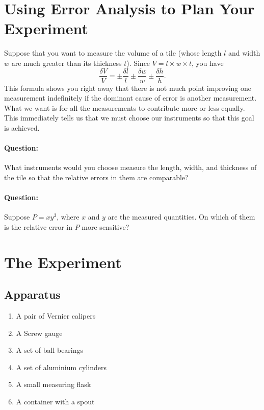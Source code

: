 \section{Using Error Analysis to Plan Your Experiment}

Suppose that you want to measure the volume of a tile (whose length $l$ and width $w$ are much greater than its thickness $t$). Since $V = l \times w \times t$, you have
\begin{equation*}
    \frac{\delta V}{V} = \pm \frac{\delta l}{l} \pm \frac{\delta w}{w} \pm \frac{\delta h}{h}.
\end{equation*}
This formula shows you right away that there is not much point improving one measurement indefinitely if the dominant cause of error is another measurement. What we want is for all the measurements to contribute more or less equally. This immediately tells us that we must choose our instruments so that this goal is achieved. 

\begin{question}
\paragraph{Question:} What instruments would you choose measure the length, width, and thickness of the tile so that the relative errors in them are comparable?~\\


\paragraph{Question:} Suppose $P = x y^3$, where $x$ and $y$ are the measured quantities. On which of them is the relative error in $P$ more sensitive?

\end{question}

\section{The Experiment}

\subsection{Apparatus}

\begin{enumerate}
    \item A pair of Vernier calipers
    \item A Screw gauge
    \item A set of ball bearings
    \item A set of aluminium cylinders
    \item A small measuring flask
    \item A container with a spout
\end{enumerate}

